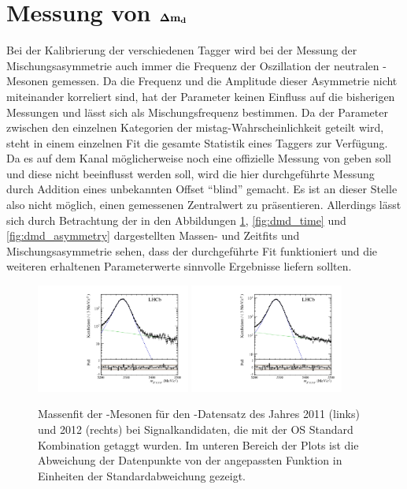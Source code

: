 \section[head={Messung von $\dmd$},tocentry={Messung von $\dmd$}]{Messung von $\mathbf{{\Delta m_{{d}}}}$}

Bei der Kalibrierung der verschiedenen Tagger wird bei der Messung der Mischungsasymmetrie auch immer die Frequenz \dmd der Oszillation der neutralen \Bz-Mesonen gemessen. Da die Frequenz und die Amplitude dieser Asymmetrie nicht miteinander korreliert sind, hat der Parameter \dmd keinen Einfluss auf die bisherigen Messungen und lässt sich als Mischungsfrequenz bestimmen. Da der Parameter \dmd zwischen den einzelnen Kategorien der mistag-Wahrscheinlichkeit geteilt wird, steht in einem einzelnen Fit die gesamte Statistik eines Taggers zur Verfügung.\\
Da es auf dem Kanal \BdToDpi möglicherweise noch eine offizielle Messung von \dmd geben soll und diese nicht beeinflusst werden soll, wird die hier durchgeführte Messung durch Addition eines unbekannten Offset \enquote{blind} gemacht. Es ist an dieser Stelle also nicht möglich, einen gemessenen Zentralwert zu präsentieren. Allerdings lässt sich durch Betrachtung der in den Abbildungen \ref{fig:dmd_mass}, \ref{fig:dmd_time} und \ref{fig:dmd_asymmetry} dargestellten Massen- und Zeitfits und Mischungsasymmetrie sehen, dass der durchgeführte Fit funktioniert und die weiteren erhaltenen Parameterwerte sinnvolle Ergebnisse liefern sollten. 
\begin{figure}[htbp]
	\centering
		\includegraphics[width=0.45\textwidth]{fig/mass_OS_2011.pdf}
		\includegraphics[width=0.45\textwidth]{fig/mass_OS_2012.pdf}
	\caption{Massenfit der \Bz-Mesonen für den \lhcb-Datensatz des Jahres \num{2011} (links) und \num{2012} (rechts) bei Signalkandidaten, die mit der OS Standard Kombination getaggt wurden. Im unteren Bereich der Plots ist die Abweichung der Datenpunkte von der angepassten Funktion in Einheiten der Standardabweichung gezeigt.}
	\label{fig:dmd_mass} 
\end{figure}
